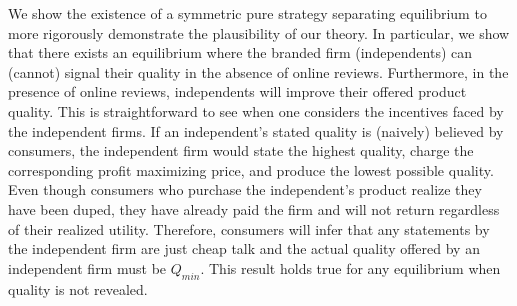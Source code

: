 \documentclass[12pt, leqno]{article}
\begin{document}
We show the existence of a symmetric pure strategy separating equilibrium to more rigorously demonstrate the plausibility of our theory. In particular, we show that there exists an equilibrium where the branded firm (independents) can (cannot) signal their quality in the absence of online reviews. Furthermore, in the presence of online reviews, independents will improve their offered product quality. This is straightforward  to see when one considers the incentives faced by the independent firms. If an independent's stated quality is (naively) believed by consumers, the independent firm would state the highest quality, charge the corresponding profit maximizing price, and produce the lowest possible quality. Even though consumers who purchase the independent's product realize they have been duped, they have already paid the firm and will not return regardless of their realized utility. Therefore, consumers will infer that any statements by the  independent firm are just cheap talk and the actual quality offered by an independent firm must be $Q_{min}$. This result holds true for any equilibrium when quality is not revealed.

\end{document}
